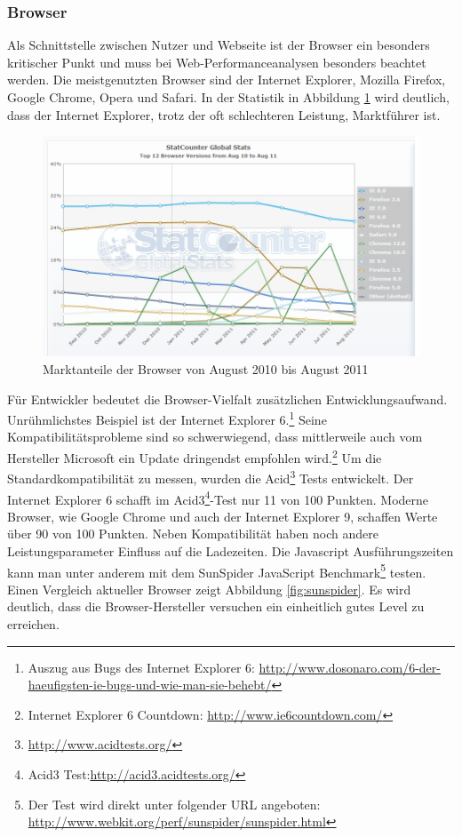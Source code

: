 \subsubsection{Browser}
Als Schnittstelle zwischen Nutzer und Webseite ist der Browser ein besonders kritischer Punkt und muss bei Web-Performanceanalysen besonders beachtet werden. Die meistgenutzten Browser sind der Internet Explorer, Mozilla Firefox, Google Chrome, Opera und Safari. In der Statistik in Abbildung \ref{fig:browseranteil} wird deutlich, dass der Internet Explorer, trotz der oft schlechteren Leistung, Marktführer ist.\citep{StatCounter2011}
\begin{figure}[!ht]
  \centering
  \includegraphics[scale=0.5]{material/browseranteil.jpg}
  \caption{Marktanteile der Browser von August 2010 bis August 2011 }
  \label{fig:browseranteil}
\end{figure}
Für Entwickler bedeutet die Browser-Vielfalt zusätzlichen Entwicklungsaufwand. Unrühmlichstes Beispiel ist der Internet Explorer 6.\footnote{Auszug aus Bugs des Internet Explorer 6: \url{http://www.dosonaro.com/6-der-haeufigsten-ie-bugs-und-wie-man-sie-behebt/}} Seine Kompatibilitätsprobleme sind so schwerwiegend, dass mittlerweile auch vom Hersteller Microsoft ein Update dringendst empfohlen wird.\footnote{Internet Explorer 6 Countdown: \url{http://www.ie6countdown.com/}}\citep{Microsoft2011} Um die Standardkompatibilität zu messen, wurden die Acid\footnote{\url{http://www.acidtests.org/}} Tests entwickelt. Der Internet Explorer 6 schafft im Acid3\footnote{Acid3 Test:\url{http://acid3.acidtests.org/}}-Test nur 11 von 100 Punkten. Moderne Browser, wie Google Chrome und auch der Internet Explorer 9, schaffen Werte über 90 von 100 Punkten. Neben Kompatibilität haben noch andere Leistungsparameter Einfluss auf die Ladezeiten. Die Javascript Ausführungszeiten kann man unter anderem mit dem SunSpider JavaScript Benchmark\footnote{Der Test wird direkt unter folgender URL angeboten: \url{http://www.webkit.org/perf/sunspider/sunspider.html}} testen. Einen Vergleich aktueller Browser zeigt Abbildung \ref{fig:sunspider}. Es wird deutlich, dass die Browser-Hersteller versuchen ein einheitlich gutes Level zu erreichen.  
